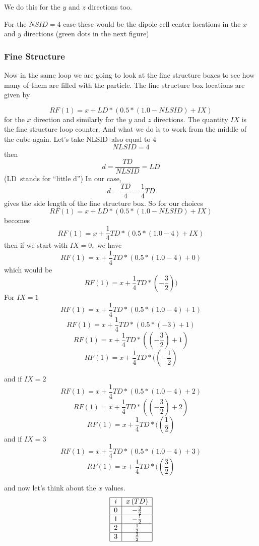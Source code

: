 \documentclass{article}
\begin{document}
We do this for the $y$ and $z$ directions too.

For the $NSID=4$ case these would be the dipole cell center locations in the 
$x$ and $y$ directions (green dots in the next figure)


\subsubsection{Fine Structure}

Now in the same loop we are going to look at the fine structure boxes to see
how many of them are filled with the particle. The fine structure box
locations are given by

\[
RF(1)=x+LD\ast (0.5\ast (1.0-NLSID)+IX) 
\]%
for the $x$ direction and similarly for the $y$ and $z$ directions. The
quantity $IX$ is the fine structure loop counter. And what we do is to work
from the middle of the cube again. Let's take NLSID\ also equal to $4$%
\[
NLSID=4 
\]%
then%
\[
d=\frac{TD}{NLSID}=LD 
\]%
(LD\ stands for \textquotedblleft little d\textquotedblright ) In our case, 
\[
d=\frac{TD}{4}=\frac{1}{4}TD 
\]%
gives the side length of the fine structure box. So for our choices%
\[
RF(1)=x+LD\ast (0.5\ast (1.0-NLSID)+IX) 
\]%
becomes 
\[
RF(1)=x+\frac{1}{4}TD\ast (0.5\ast (1.0-4)+IX) 
\]
then if we start with $IX=0,$ we have 
\[
RF(1)=x+\frac{1}{4}TD\ast (0.5\ast (1.0-4)+0) 
\]
which would be 
\[
RF(1)=x+\frac{1}{4}TD\ast (-\frac{3}{2})) 
\]%
For $IX=1$%
\[
RF(1)=x+\frac{1}{4}TD\ast (0.5\ast (1.0-4)+1) 
\]%
\[
RF(1)=x+\frac{1}{4}TD\ast (0.5\ast (-3)+1) 
\]%
\[
RF(1)=x+\frac{1}{4}TD\ast ((-\frac{3}{2})+1) 
\]%
\[
RF(1)=x+\frac{1}{4}TD\ast ((-\frac{1}{2}) 
\]

and if $IX=2$ 
\[
RF(1)=x+\frac{1}{4}TD\ast (0.5\ast (1.0-4)+2) 
\]%
\[
RF(1)=x+\frac{1}{4}TD\ast ((-\frac{3}{2})+2) 
\]%
\[
RF(1)=x+\frac{1}{4}TD\ast ((\frac{1}{2}) 
\]%
and if $IX=3$%
\[
RF(1)=x+\frac{1}{4}TD\ast (0.5\ast (1.0-4)+3) 
\]%
\[
RF(1)=x+\frac{1}{4}TD\ast ((\frac{3}{2}) 
\]

and now let's think about the $x$ values. 
\[
\begin{tabular}{|c|c|}
\hline
$i$ & $x\left( TD\right) $ \\ \hline
$0$ & $-\frac{3}{2}$ \\ \hline
$1$ & $-\frac{1}{2}$ \\ \hline
$2$ & $\frac{1}{2}$ \\ \hline
$3$ & $\frac{3}{2}$ \\ \hline
\end{tabular}%
\]
\end{document}
